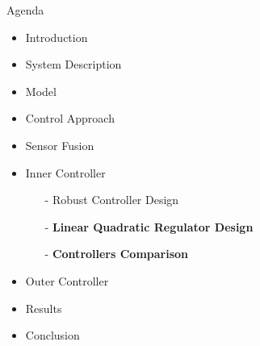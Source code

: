 \begin{frame}{Agenda}{}
    \begin{itemize}
        \item Introduction
        \item System Description
        \item Model
        \item Control Approach
        \item Sensor Fusion
        \item Inner Controller
        \begin{itemize}
            \item[-] Robust Controller Design
            \item[-] \textbf{Linear Quadratic Regulator Design}
            \item[-] \textbf{Controllers Comparison}
        \end{itemize}
        \item Outer Controller
        \item Results
        \item Conclusion
    \end{itemize}
\end{frame}